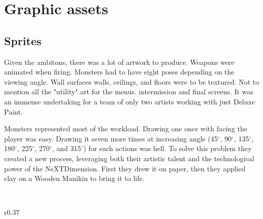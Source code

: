 \section{Graphic assets}
\subsection{Sprites}
Given the ambitons, there was a lot of artwork to produce. Weapons were animated when firing. Monsters had to have eight poses depending on the viewing angle. Wall surfaces walls, ceilings, and floors were to be textured. Not to mention all the "utility" art for the menus. intermission and final screens. It was an immense undertaking for a team of only two artists working with just Deluxe Paint.\\
\par
Monsters represented most of the workload. Drawing one once with facing the player was easy. Drawing it seven more times at increasing angle (45$^{\circ}$, 90$^{\circ}$, 135$^{\circ}$, 180$^{\circ}$, 225$^{\circ}$, 270$^{\circ}$, and 315$^{\circ}$) for each actions was hell. To solve this problem they created a new process, leveraging both their artistic talent and the technological power of the NeXTDimension. First they drew it on paper, then they applied clay on a Wooden Manikin to bring it to life.\\
\par


\\


\begin{wrapfigure}[8]{r}{0.37\textwidth}
\centering
{}
\end{wrapfigure}

